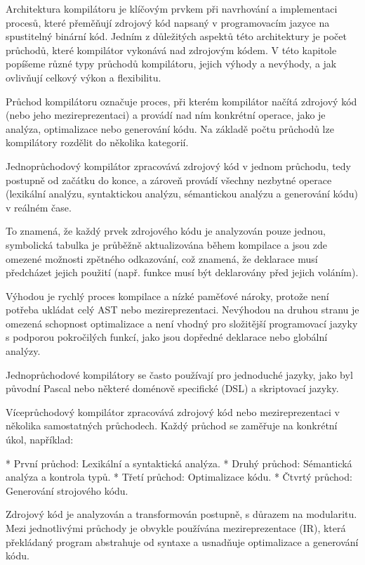 
Architektura kompilátoru je klíčovým prvkem při navrhování a implementaci procesů, které přeměňují zdrojový kód napsaný v programovacím jazyce na spustitelný binární kód. Jedním z důležitých aspektů této architektury je počet průchodů, které kompilátor vykonává nad zdrojovým kódem. V této kapitole popíšeme různé typy průchodů kompilátoru, jejich výhody a nevýhody, a jak ovlivňují celkový výkon a flexibilitu.

Průchod kompilátoru označuje proces, při kterém kompilátor načítá zdrojový kód (nebo jeho mezireprezentaci) a provádí nad ním konkrétní operace, jako je analýza, optimalizace nebo generování kódu.
Na základě počtu průchodů lze kompilátory rozdělit do několika kategorií.

Jednoprůchodový kompilátor zpracovává zdrojový kód v jednom průchodu, tedy postupně od začátku do konce, a zároveň provádí všechny nezbytné operace (lexikální analýzu, syntaktickou analýzu, sémantickou analýzu a generování kódu) v reálném čase.

To znamená, že každý prvek zdrojového kódu je analyzován pouze jednou, symbolická tabulka je průběžně aktualizována během kompilace a jsou zde omezené možnosti zpětného odkazování, což znamená, že deklarace musí předcházet jejich použití (např. funkce musí být deklarovány před jejich voláním).

Výhodou je rychlý proces kompilace a nízké paměťové nároky, protože není potřeba ukládat celý AST nebo mezireprezentaci. Nevýhodou na druhou stranu je omezená schopnost optimalizace a není vhodný pro složitější programovací jazyky s podporou pokročilých funkcí, jako jsou dopředné deklarace nebo globální analýzy.

Jednoprůchodové kompilátory se často používají pro jednoduché jazyky, jako byl původní Pascal nebo některé doménově specifické (DSL) a skriptovací jazyky.

Víceprůchodový kompilátor zpracovává zdrojový kód nebo mezireprezentaci v několika samostatných průchodech. Každý průchod se zaměřuje na konkrétní úkol, například:

\begitems
* První průchod: Lexikální a syntaktická analýza.
* Druhý průchod: Sémantická analýza a kontrola typů.
* Třetí průchod: Optimalizace kódu.
* Čtvrtý průchod: Generování strojového kódu.
\enditems

Zdrojový kód je analyzován a transformován postupně, s důrazem na modularitu. Mezi jednotlivými průchody je obvykle používána mezireprezentace (IR), která překládaný program abstrahuje od syntaxe a usnadňuje optimalizace a generování kódu. 

